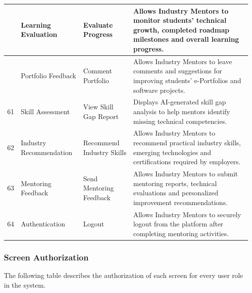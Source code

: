 \begin{longtable}{|>{\centering\arraybackslash}p{0.8cm}|p{3.2cm}|p{3.5cm}|p{8cm}|}
59 &
Learning Evaluation &
Evaluate Progress &
Allows Industry Mentors to monitor students' technical growth, completed roadmap milestones and overall learning progress.
\\
\hline

60 &
Portfolio Feedback &
Comment Portfolio &
Allows Industry Mentors to leave comments and suggestions for improving students' e-Portfolios and software projects.
\\
\hline

61 &
Skill Assessment &
View Skill Gap Report &
Displays AI-generated skill gap analysis to help mentors identify missing technical competencies.
\\
\hline

62 &
Industry Recommendation &
Recommend Industry Skills &
Allows Industry Mentors to recommend practical industry skills, emerging technologies and certifications required by employers.
\\
\hline

63 &
Mentoring Feedback &
Send Mentoring Feedback &
Allows Industry Mentors to submit mentoring reports, technical evaluations and personalized improvement recommendations.
\\
\hline

64 &
Authentication &
Logout &
Allows Industry Mentors to securely logout from the platform after completing mentoring activities.
\\
\hline

\end{longtable}

\subsubsection{Screen Authorization}

The following table describes the authorization of each screen for every user role in the system.

\renewcommand{\arraystretch}{1.4}

